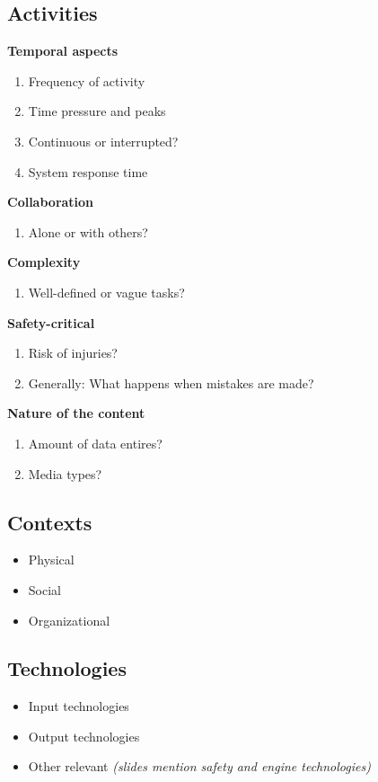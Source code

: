 \subsection{Activities}
\textbf{Temporal aspects}
\begin{enumerate}
	\item Frequency of activity
	\item Time pressure and peaks
	\item Continuous or interrupted?
	\item System response time
\end{enumerate}
\textbf{Collaboration}
\begin{enumerate}[resume]
	\item Alone or with others?
\end{enumerate}
\textbf{Complexity}
\begin{enumerate}[resume]
	\item Well-defined or vague tasks?
\end{enumerate}
\textbf{Safety-critical}
\begin{enumerate}[resume]
	\item Risk of injuries?
	\item Generally: What happens when mistakes are made?
\end{enumerate}
\textbf{Nature of the content}
\begin{enumerate}[resume]
	\item Amount of data entires?
	\item Media types?
\end{enumerate}

\subsection{Contexts}
\begin{itemize}
	\item Physical
	\item Social
	\item Organizational
\end{itemize}

\subsection{Technologies}
\begin{itemize}
	\item Input technologies
	\item Output technologies
	\item Other relevant \textit{(slides mention safety and engine technologies)}
\end{itemize}